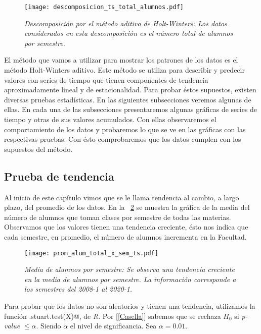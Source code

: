 \begin{figure}[H]
\centering
\texttt{[image: descomposicion\_ts\_total\_alumnos.pdf]} %
\caption[\textit{Descomposición por el método aditivo de Holt-Winters}]{\textit{Descomposición por el método aditivo de Holt-Winters: Los datos considerados en esta descomposición es el número total de alumnos por semestre.}}\label{img_en_ing_2}
\end{figure}

El método que vamos a utilizar para mostrar los patrones de los datos es el método Holt-Winters aditivo. Este método se utiliza para describir y predecir valores con series de tiempo que tienen componentes de tendencia aproximadamente lineal y de estacionalidad. Para probar éstos supuestos, existen diversas pruebas estadísticas. En las siguientes subsecciones veremos algunas de ellas. En cada una de las subsecciones presentaremos algunas gráficas de series de tiempo y otras de sus valores acumulados. Con ellas observaremos el comportamiento de los datos y probaremos lo que se ve en las gráficas con las respectivas pruebas. Con ésto comprobaremos que los datos cumplen con los supuestos del método.


\subsection{Prueba de tendencia}

Al inicio de este capítulo vimos que se le llama tendencia al cambio, a largo plazo, del promedio de los datos. En la \figurename{~\ref{prom_alum_x_sem_ts}} se muestra la gráfica de la media del número de alumnos que toman clases por semestre de todas las materias. Observamos que los valores tienen una tendencia creciente, ésto nos indica que cada semestre, en promedio, el número de alumnos incrementa en la Facultad.

\begin{figure}[H]
\centering
\texttt{[image: prom\_alum\_total\_x\_sem\_ts.pdf]} %
\caption[\textit{Media de alumnos por semestre}]{\textit{Media de alumnos por semestre: Se observa una tendencia creciente en la media de alumnos por semestre. La información corresponde a los semestres del 2008-1 al 2020-1.}}\label{prom_alum_x_sem_ts}
\end{figure}

Para probar que los datos no son aleatorios y tienen una tendencia, utilizamos la función \verb@cox.stuart.test(X)@, de \textit{R}. Por [\ref{Casella}] sabemos que se rechaza $H_{0}$ si \textit{p-value} $ \leqslant \alpha$. Siendo $\alpha$ el nivel de significancia. Sea $\alpha = 0.01$.

